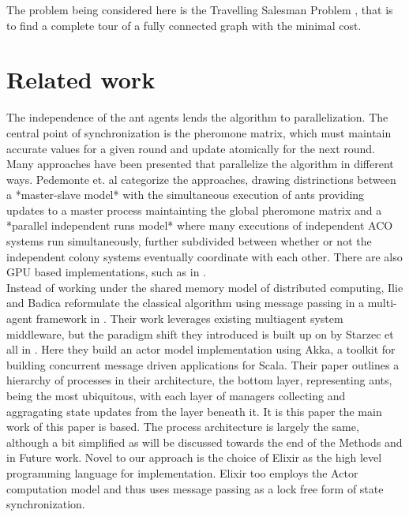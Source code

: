 \documentclass[12pt]{article}
\begin{document}
    The problem being considered here is the Travelling Salesman Problem \cite{wikiTSP},
    that is to find a complete tour of a fully connected graph with the minimal 
    cost.


\section{Related work}
The independence of the ant agents lends the algorithm to parallelization. 
The central point of synchronization is the pheromone matrix, which must 
maintain accurate values for a given round and update atomically for the 
next round. Many approaches have been presented that parallelize the algorithm 
in different ways. Pedemonte et. al \cite{SurveyParallel} categorize 
the approaches, drawing distrinctions between a *master-slave model*
with the simultaneous execution of ants providing updates to 
a master process maintainting the global pheromone matrix and a
*parallel independent runs model* where many
executions of independent ACO systems run simultaneously,
further subdivided between
whether or not the independent colony systems eventually coordinate
 with each other. 
There are also GPU based implementations, such as in \cite{GPU}.
\\

Instead of working under the shared memory model of distributed 
computing, Ilie and Badica
reformulate the classical algorithm using message 
passing in a multi-agent framework  in \cite{multiagent}.
Their work leverages existing multiagent system middleware, but the paradigm
shift they introduced is built up on by Starzec et all in \cite{star1}.
Here they build an actor model\cite{ActorModel} implementation
using Akka, a toolkit for building concurrent message driven applications 
for Scala. Their paper outlines a hierarchy of processes in their architecture,
the bottom layer, representing ants, being the most ubiquitous, with each 
layer of managers collecting and aggragating state updates from the layer
beneath it. It is this paper the main work of this paper is based.
The process architecture is largely the same, although a bit simplified 
as will be discussed towards the end of the Methods and in Future work. 
Novel to our approach is the choice of Elixir as the high level programming
language for implementation. Elixir too employs the Actor computation model and 
thus uses message passing as a lock free form of state synchronization.
\end{document}
